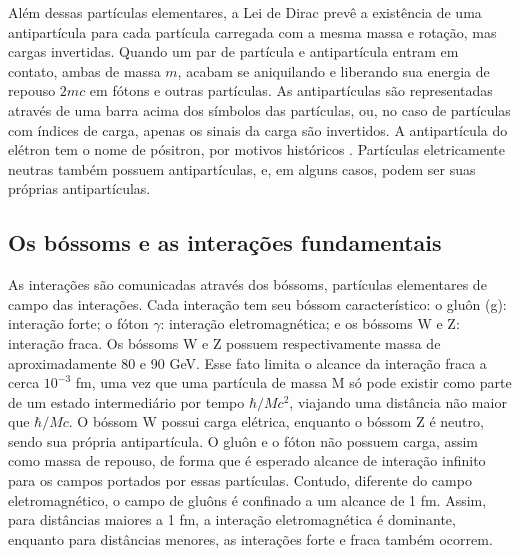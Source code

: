 Além dessas partículas elementares, a Lei de Dirac prevê a
existência de uma antipartícula para cada partícula carregada
com a mesma massa e rotação, mas cargas invertidas. 
Quando um par de partícula e antipartícula entram em contato,
ambas de massa $m$, acabam se aniquilando e liberando sua energia de repouso $2mc$ em fótons e outras
partículas. As antipartículas são representadas através de uma barra acima dos símbolos
das partículas, ou, no caso de partículas com índices de carga, 
apenas os sinais da carga são invertidos. 
A antipartícula do elétron tem o nome de pósitron, por motivos
históricos \cite{Intro_Standard,Intro_Nuclear}. Partículas 
eletricamente neutras também possuem antipartículas, e, em alguns casos,
podem ser suas próprias antipartículas.

\subsection{Os bóssoms e as interações fundamentais}
\label{ssec:bossoms}

As interações são comunicadas através dos bóssoms, partículas elementares
de campo das interações. Cada interação tem seu
bóssom característico: o gluôn (g): interação forte; o fóton $\gamma$: interação 
eletromagnética; e os bóssoms W e Z: interação fraca.  
Os bóssoms W e Z possuem respectivamente massa de aproximadamente
80 e 90 GeV. Esse fato limita o alcance da interação fraca a cerca $10^{-3}$ fm,
uma vez que uma partícula de massa M só pode existir como parte de um estado
intermediário por tempo $\hbar/Mc^2$, viajando uma distância não maior que
$\hbar/Mc$. O bóssom W possui carga elétrica, enquanto o bóssom Z é neutro, sendo sua própria antipartícula.
O gluôn e o fóton não possuem carga, assim como massa de repouso, de forma que é esperado alcance de
interação infinito para os campos portados por essas partículas. 
Contudo, diferente do campo eletromagnético, o campo de
gluôns é confinado a um alcance de 1 fm. 
Assim, para distâncias maiores a 1 fm, a interação eletromagnética é dominante,
enquanto para distâncias menores, as interações forte e fraca também ocorrem.

